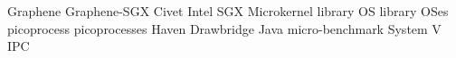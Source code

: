 \documentclass[12pt]{report}
\makeatletter
\newcommand{\thesisauthor}{Chia-Che Tsai}
\newcommand*{\declarecommand}{%
  \@star@or@long\declare@command
}
\newcommand*{\declare@command}[1]{%
  \provide@command{#1}{}%
  \renew@command{#1}%
}
\makeatother
\begin{document}


\declarecommand{\graphene}{Graphene}
\declarecommand{\graphenesgx}{Graphene-SGX}
\declarecommand{\civet}{Civet}
\declarecommand{\intel}{Intel}
\declarecommand{\sgx}{SGX}
\declarecommand{\microkernel}{Microkernel}
\declarecommand{\libos}{library OS}
\declarecommand{\liboses}{library OSes}
\declarecommand{\picoproc}{picoprocess}
\declarecommand{\picoprocs}{picoprocesses}
\declarecommand{\haven}{Haven}
\declarecommand{\drawbridge}{Drawbridge}
\declarecommand{\java}{Java}
\declarecommand{\microbench}{micro-benchmark}
\declarecommand{\sysvipc}{System V IPC}


\newpage
{}
\setcounter{page}{2}
\end{document}
